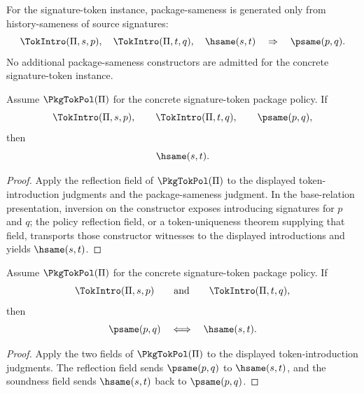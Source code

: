 \begin{definition}
For the signature-token instance, package-sameness is generated only from history-sameness of source signatures:
$$
  \TokIntro(\Pi,s,p),\quad
  \TokIntro(\Pi,t,q),\quad
  \hsame(s,t)
  \quad\Rightarrow\quad
  \psame(p,q).
$$
No additional package-sameness constructors are admitted for the concrete signature-token instance.
\end{definition}

\begin{theorem}
\label{thm:package-reflection}
Assume $\PkgTokPol(\Pi)$ for the concrete signature-token package policy. If
$$
  \TokIntro(\Pi,s,p),\qquad
  \TokIntro(\Pi,t,q),\qquad
  \psame(p,q),
$$
then
$$
  \hsame(s,t).
$$
\end{theorem}

\begin{proof}
Apply the reflection field of $\PkgTokPol(\Pi)$ to the displayed token-introduction judgments and the package-sameness judgment. In the base-relation presentation, inversion on the constructor exposes introducing signatures for $p$ and $q$; the policy reflection field, or a token-uniqueness theorem supplying that field, transports those constructor witnesses to the displayed introductions and yields $\hsame(s,t)$.
\end{proof}

\begin{corollary}
\label{cor:concrete-package-equivalence-signature-grounded}
Assume $\PkgTokPol(\Pi)$ for the concrete signature-token package policy. If
$$
\TokIntro(\Pi,s,p)
\qquad\text{and}\qquad
\TokIntro(\Pi,t,q),
$$
then
$$
\psame(p,q)
\quad\Longleftrightarrow\quad
\hsame(s,t).
$$
\end{corollary}

\begin{proof}
Apply the two fields of $\PkgTokPol(\Pi)$ to the displayed token-introduction judgments. The reflection field sends $\psame(p,q)$ to $\hsame(s,t)$, and the soundness field sends $\hsame(s,t)$ back to $\psame(p,q)$.
\end{proof}
